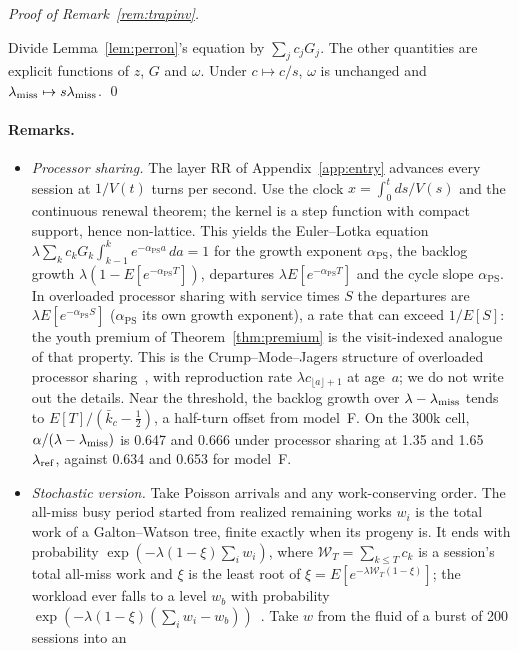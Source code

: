\noindent\emph{Proof of Remark~\ref{rem:trapinv}.}

Divide Lemma~\ref{lem:perron}'s equation by $\sum_jc_jG_j$. The other quantities are explicit functions of $z$, $G$ and
$\omega$. Under $c\mapsto c/s$, $\omega$ is unchanged and $\lambda_{\mathrm{miss}}\mapsto s\lambda_{\mathrm{miss}}$. \qed

\paragraph{Remarks.}
\begin{itemize}[leftmargin=*,nosep]
\item \emph{Processor sharing.} The layer RR of Appendix~\ref{app:entry} advances every session at $1/V(t)$ turns per second. Use
the clock $x=\int_0^t ds/V(s)$ and the continuous renewal theorem; the kernel is a step function with compact support, hence
non-lattice. This yields the Euler--Lotka equation $\lambda\sum_kc_kG_k\int_{k-1}^ke^{-\alpha_{\mathrm{PS}}a}\,da=1$ for the growth exponent
$\alpha_{\mathrm{PS}}$, the backlog growth $\lambda(1-E[e^{-\alpha_{\mathrm{PS}}T}])$, departures $\lambda E[e^{-\alpha_{\mathrm{PS}}T}]$
and the cycle slope $\alpha_{\mathrm{PS}}$. In overloaded processor sharing with service times $S$ the departures are
$\lambda E[e^{-\alpha_{\mathrm{PS}}S}]$ ($\alpha_{\mathrm{PS}}$ its own growth exponent), a rate that can exceed $1/E[S]$: the
youth premium of Theorem~\ref{thm:premium} is the visit-indexed analogue of that property. This is the Crump--Mode--Jagers
structure of overloaded processor sharing~\citep{grishechkin1992processor,jeanmarie1994transient,puha2006overloaded}, with
reproduction rate $\lambda c_{\lfloor a\rfloor+1}$ at age~$a$; we do not write out the details. Near the threshold, the
backlog growth over $\lambda-\lambda_{\mathrm{miss}}$ tends to $E[T]/(\bar k_c-\tfrac12)$, a half-turn offset from model~F. On the 300k cell,
$\alpha/(\lambda-\lambda_{\mathrm{miss}})$ is 0.647 and 0.666 under processor sharing at 1.35 and 1.65~$\lambda_{\mathrm{ref}}$, against 0.634 and 0.653 for
model~F.
\item \emph{Stochastic version.} Take Poisson arrivals and any work-conserving order. The all-miss busy period started from
realized remaining works $w_i$ is the total work of a Galton--Watson tree, finite exactly when its progeny is. It ends with
probability $\exp(-\lambda(1-\xi)\sum_iw_i)$, where $\mathcal W_T=\sum_{k\le T}c_k$ is a session's total all-miss work and $\xi$
is the least root of $\xi=E[e^{-\lambda\mathcal W_T(1-\xi)}]$; the workload ever falls to a level $w_b$ with probability
$\exp(-\lambda(1-\xi)(\sum_iw_i-w_b))$~\citep{kendall1951some}. Take $w$ from the fluid of a burst of 200 sessions into an

\end{itemize}
